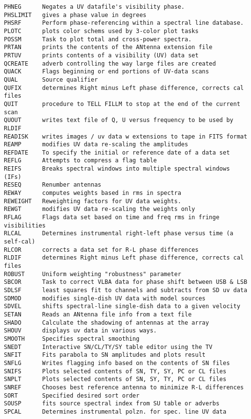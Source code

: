 \begin{verbatim}
PHNEG      Negates a UV datafile's visibility phase.
PHSLIMIT   gives a phase value in degrees
PHSRF      Perform phase-referencing within a spectral line database.
PLOTC      plots color schems used by 3-color plot tasks
POSSM      Task to plot total and cross-power spectra.
PRTAN      prints the contents of the ANtenna extension file
PRTUV      prints contents of a visibility (UV) data set
QCREATE    adverb controlling the way large files are created
QUACK      Flags beginning or end portions of UV-data scans
QUAL       Source qualifier
QUFIX      determines Right minus Left phase difference, corrects cal files
QUIT       procedure to TELL FILLM to stop at the end of the current scan
QUOUT      writes text file of Q, U versus frequency to be used by RLDIF
READISK    writes images / uv data w extensions to tape in FITS format
REAMP      modifies UV data re-scaling the amplitudes
REFDATE    To specify the initial or reference date of a data set
REFLG      Attempts to compress a flag table
REIFS      Breaks spectral windows into multiple spectral windows (IFs)
RESEQ      Renumber antennas
REWAY      computes weights based in rms in spectra
REWEIGHT   Reweighting factors for UV data weights.
REWGT      modifies UV data re-scaling the weights only
RFLAG      Flags data set based on time and freq rms in fringe visibilities
RLCAL      Determines instrumental right-left phase versus time (a self-cal)
RLCOR      corrects a data set for R-L phase differences
RLDIF      determines Right minus Left phase difference, corrects cal files
ROBUST     Uniform weighting "robustness" parameter
SBCOR      Task to correct VLBA data for phase shift between USB & LSB
SDLSF      least squares fit to channels and subtracts from SD uv data
SDMOD      modifies single-dish UV data with model sources
SDVEL      shifts spectral-line single-dish data to a given velocity
SETAN      Reads an ANtenna file info from a text file
SHADO      Calculate the shadowing of antennas at the array
SHOUV      displays uv data in various ways.
SMOOTH     Specifies spectral smoothing
SNEDT      Interactive SN/CL/TY/SY table editor using the TV
SNFIT      Fits parabola to SN amplitudes and plots result
SNFLG      Writes flagging info based on the contents of SN files
SNIFS      Plots selected contents of SN, TY, SY, PC or CL files
SNPLT      Plots selected contents of SN, SY, TY, PC or CL files
SNREF      Chooses best reference antenna to minimize R-L differences
SORT       Specified desired sort order
SOUSP      fits source spectral index from SU table or adverbs
SPCAL      Determines instrumental polzn. for spec. line UV data

\end{verbatim}
